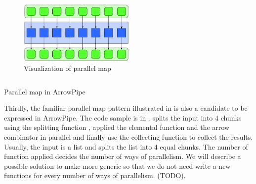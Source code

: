 \begin{figure}[ht]
    \centering
    \includegraphics[width=0.5\textwidth]{arrow/pmap.png} 
    \caption{Visualization of parallel map \cite{mccoolStructuredParallelPrograming2012}}
    \label{arrow:fig:pmap}
\end{figure}
\begin{listing}[ht]
    \inputminted{Haskell}{arrow/pmap.hs}
    \caption{Parallel map in ArrowPipe}
    \label{arrow:code:pmap}
\end{listing}
Thirdly, the familiar parallel map pattern illustrated in  is also a candidate to be expressed in ArrowPipe. The code sample is in .  splits the input  into 4 chunks using the splitting function , applied the elemental function  and the arrow combinator \hask{***} in parallel and finally use the collecting function  to collect the results. Usually, the input  is a list and  splits the list into 4 equal chunks. The number of function  applied decides the number of ways of parallelism. We will describe a possible solution to make  more generic so that we do not need write a new functions for every number of ways of parallelism. (TODO).

